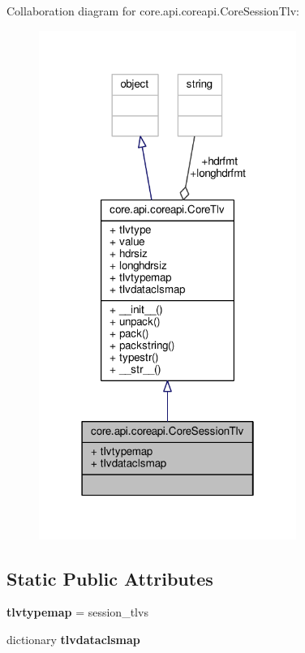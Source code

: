 Collaboration diagram for core.\+api.\+coreapi.\+Core\+Session\+Tlv\+:
\nopagebreak
\begin{figure}[H]
\begin{center}
\leavevmode
\includegraphics[width=238pt]{classcore_1_1api_1_1coreapi_1_1_core_session_tlv__coll__graph}
\end{center}
\end{figure}
\subsection*{Static Public Attributes}
\begin{DoxyCompactItemize}
\item 
\hypertarget{classcore_1_1api_1_1coreapi_1_1_core_session_tlv_a94f47ce1cff00c50126b659307340143}{{\bfseries tlvtypemap} = session\+\_\+tlvs}\label{classcore_1_1api_1_1coreapi_1_1_core_session_tlv_a94f47ce1cff00c50126b659307340143}

\item 
dictionary {\bfseries tlvdataclsmap}
\end{DoxyCompactItemize}
